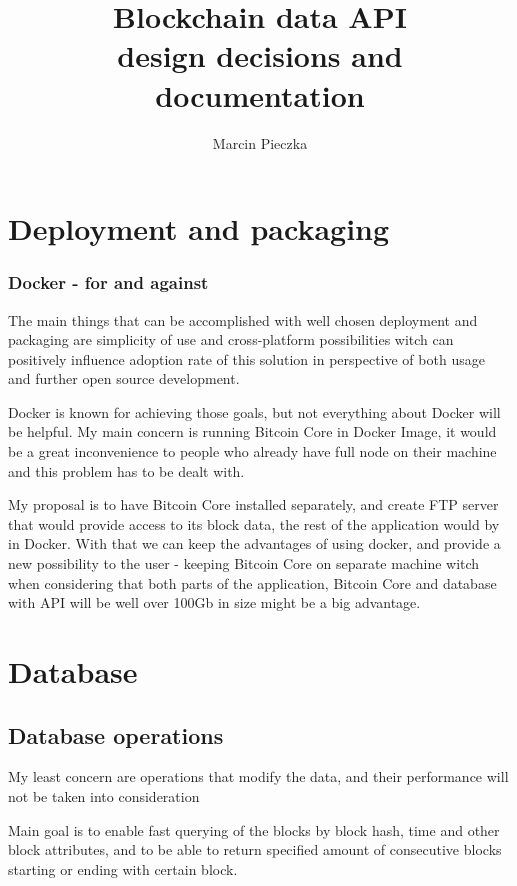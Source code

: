 \documentclass{article}
\begin{document}
\title{
	Blockchain data API \\
	\large design decisions and documentation
}
\date{}
\author{Marcin Pieczka}
\maketitle

\section{Deployment and packaging}
\subsubsection*{Docker - for and against}

The main things that can be accomplished with well chosen deployment and packaging are simplicity of use and cross-platform possibilities witch can positively influence adoption rate of this solution in perspective of both usage and further open source development.

Docker is known for achieving those goals, but not everything about Docker will be helpful. My main concern is running Bitcoin Core in Docker Image, it would be a great inconvenience to people who already have full node on their machine and this problem has to be dealt with.

My proposal is to have Bitcoin Core installed separately, and create FTP server that would provide access to its block data, the rest of the application would by in Docker. With that we can keep the advantages of using docker, and provide a new possibility to the user - keeping Bitcoin Core on separate machine witch when considering that both parts of the application, Bitcoin Core and database with API will be well over 100Gb in size might be a big advantage. 

\section{Database}
\subsection*{Database operations}
My least concern are operations that modify the data, and their performance will not be taken into consideration

Main goal is to enable fast querying of the blocks by block hash, time and other block attributes, and to be able to return specified amount of consecutive blocks starting or ending with certain block. 
\end{document}
